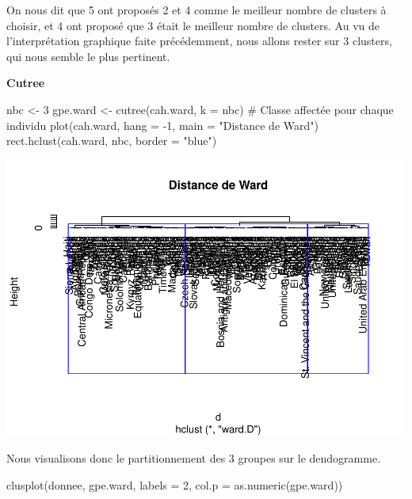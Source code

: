 \documentclass[
]{article}
\newenvironment{Shaded}{}{}
\newcommand{\AttributeTok}[1]{#1}
\newcommand{\CommentTok}[1]{\textcolor[rgb]{0.00,0.50,0.00}{#1}}
\newcommand{\DecValTok}[1]{#1}
\newcommand{\FunctionTok}[1]{#1}
\newcommand{\NormalTok}[1]{#1}
\newcommand{\OtherTok}[1]{\textcolor[rgb]{1.00,0.25,0.00}{#1}}
\newcommand{\SpecialCharTok}[1]{\textcolor[rgb]{0.00,0.50,0.50}{#1}}
\newcommand{\StringTok}[1]{\textcolor[rgb]{0.00,0.50,0.50}{#1}}
\begin{document}
On nous dit que 5 ont proposés 2 et 4 comme le meilleur nombre de
clusters à choisir, et 4 ont proposé que 3 était le meilleur nombre de
clusters. Au vu de l'interprétation graphique faite précédemment, nous
allons rester sur 3 clusters, qui nous semble le plus pertinent.

\textbf{Cutree}

\begin{Shaded}
\begin{Highlighting}[]
\NormalTok{nbc }\OtherTok{\textless{}{-}} \DecValTok{3}
\NormalTok{gpe.ward }\OtherTok{\textless{}{-}} \FunctionTok{cutree}\NormalTok{(cah.ward, }\AttributeTok{k =}\NormalTok{ nbc) }\CommentTok{\# Classe affectée pour chaque individu}
\FunctionTok{plot}\NormalTok{(cah.ward, }\AttributeTok{hang =} \SpecialCharTok{{-}}\DecValTok{1}\NormalTok{, }\AttributeTok{main =} \StringTok{"Distance de Ward"}\NormalTok{)}
\FunctionTok{rect.hclust}\NormalTok{(cah.ward, nbc, }\AttributeTok{border =} \StringTok{"blue"}\NormalTok{)}
\end{Highlighting}
\end{Shaded}

\includegraphics{Projet_files/figure-latex/unnamed-chunk-18-1.pdf}

Nous visualisons donc le partitionnement des 3 groupes sur le
dendogramme.

\begin{Shaded}
\begin{Highlighting}[]
\FunctionTok{clusplot}\NormalTok{(donnee, gpe.ward, }\AttributeTok{labels =} \DecValTok{2}\NormalTok{, }\AttributeTok{col.p =} \FunctionTok{as.numeric}\NormalTok{(gpe.ward))}
\end{Highlighting}
\end{Shaded}
\end{document}
